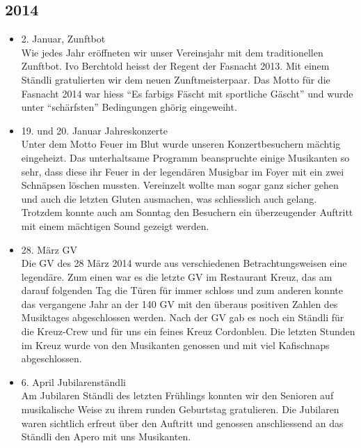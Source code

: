 \subsection{2014}
\begin{history}


    \begin{itemize}

        \item 2. Januar, Zunftbot\\
              Wie jedes Jahr eröffneten wir unser Vereinsjahr mit dem traditionellen
              Zunftbot. Ivo Berchtold heisst der Regent der Fasnacht 2013. Mit einem
              Ständli gratulierten wir dem neuen Zunftmeisterpaar. Das Motto für die
              Fasnacht 2014 war hiess \enquote{Es farbigs Fäscht mit sportliche
                  Gäscht} und wurde unter \enquote{schärfsten} Bedingungen ghörig
              eingeweiht.

        \item 19. und 20. Januar Jahreskonzerte\\
              Unter dem Motto Feuer im Blut wurde unseren Konzertbesuchern mächtig
              eingeheizt. Das unterhaltsame Programm beanspruchte einige Musikanten so
              sehr, dass diese ihr Feuer in der legendären Musigbar im Foyer mit ein
              zwei Schnäpsen löschen mussten. Vereinzelt wollte man sogar ganz sicher
              gehen und auch die letzten Gluten ausmachen, was schliesslich auch
              gelang. Trotzdem konnte auch am Sonntag den Besuchern ein überzeugender
              Auftritt mit einem mächtigen Sound gezeigt werden.

        \item 28. März GV\\
              Die GV des 28 März 2014 wurde aus verschiedenen Betrachtungsweisen eine
              legendäre. Zum einen war es die letzte GV im Restaurant Kreuz, das am
              darauf folgenden Tag die Türen für immer schloss und zum anderen konnte
              das vergangene Jahr an der 140 GV mit den überaus positiven Zahlen des
              Musiktages abgeschlossen werden. Nach der GV gab es noch ein Ständli für
              die Kreuz-Crew und für uns ein feines Kreuz Cordonbleu.  Die letzten
              Stunden im Kreuz wurde von den Musikanten  genossen und mit viel
              Kafischnaps abgeschlossen.

        \item 6. April Jubilarenständli\\
              Am Jubilaren Ständli des letzten Frühlings konnten wir den Senioren auf
              musikalische Weise zu ihrem runden Geburtstag gratulieren. Die Jubilaren
              waren sichtlich erfreut über den Auftritt und genossen anschliessend an
              das Ständli den Apero mit uns Musikanten.


\end{itemize}
\end{history}
